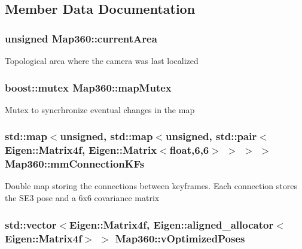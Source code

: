 \subsection{Member Data Documentation}
\hypertarget{structMap360_a6089d8dc88895558887769db3300a132}{
\subsubsection[{current\-Area}]{\setlength{\rightskip}{0pt plus 5cm}unsigned Map360\-::current\-Area}}\label{structMap360_a6089d8dc88895558887769db3300a132}
Topological area where the camera was last localized \hypertarget{structMap360_a46200d015411f7421778c096d236dd7c}{
\subsubsection[{map\-Mutex}]{\setlength{\rightskip}{0pt plus 5cm}boost\-::mutex Map360\-::map\-Mutex}}\label{structMap360_a46200d015411f7421778c096d236dd7c}
Mutex to syncrhronize eventual changes in the map \hypertarget{structMap360_ad7aed73485cab8d7b6b91a053831fb99}{
\subsubsection[{mm\-Connection\-K\-Fs}]{\setlength{\rightskip}{0pt plus 5cm}std\-::map$<$unsigned, std\-::map$<$unsigned, std\-::pair$<$Eigen\-::\-Matrix4f, Eigen\-::\-Matrix$<$float,6,6$>$ $>$ $>$ $>$ Map360\-::mm\-Connection\-K\-Fs}}\label{structMap360_ad7aed73485cab8d7b6b91a053831fb99}
Double map storing the connections between keyframes. Each connection stores the S\-E3 pose and a 6x6 covariance matrix \hypertarget{structMap360_aee86cfa9b18e8f40f2a351b16d4acd4b}{
\subsubsection[{v\-Optimized\-Poses}]{\setlength{\rightskip}{0pt plus 5cm}std\-::vector$<$Eigen\-::\-Matrix4f, Eigen\-::aligned\-\_\-allocator$<$Eigen\-::\-Matrix4f$>$ $>$ Map360\-::v\-Optimized\-Poses}}\label{structMap360_aee86cfa9b18e8f40f2a351b16d4acd4b}
